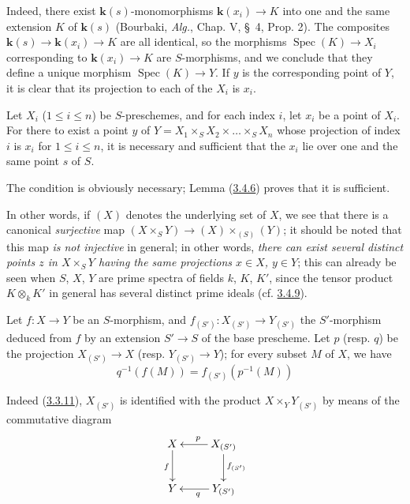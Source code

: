 Indeed, there exist $\boldsymbol{k}(s)$-monomorphisms $\boldsymbol{k}(x_i)\to K$ into one and the same
extension $K$ of $\boldsymbol{k}(s)$ (Bourbaki, \emph{Alg.}, Chap. V, \S~4, Prop. 2). The
composites $\boldsymbol{k}(s)\to \boldsymbol{k}(x_i)\to K$ are all identical, so the morphisms
$\operatorname{Spec}(K)\to X_i$ corresponding to $\boldsymbol{k}(x_i)\to K$ are
$S$-morphisms, and we conclude that they define a unique morphism
$\operatorname{Spec}(K)\to Y$. If $y$ is the corresponding point of $Y$, it
is clear that its projection to each of the $X_i$ is $x_i$.

\begin{proposition}[3.4.7]
\label{I.3.4.7}
Let $X_i$ ($1\leq i\leq n$) be $S$-preschemes, and for each index $i$,
let $x_i$ be a point of $X_i$. For there to exist a point $y$ of
$Y=X_1\times_S X_2\times\ldots\times_S X_n$ whose projection of index $i$ is
$x_i$ for $1\leq i\leq n$, it is necessary and sufficient that the $x_i$ lie
over one and the same point $s$ of $S$.
\end{proposition}

The condition is obviously necessary; Lemma
(\hyperref[I.3.4.6]{3.4.6}) proves that it is sufficient.

\label{I.3.4.7.underlying-map}
In other words, if $(X)$ denotes the underlying set of $X$, we
see that there is a canonical \emph{surjective} map
$(X\times_S Y)\to (X)\times_{(S)}(Y)$; it should be noted that this map
\emph{is not injective} in general; in other words, \emph{there can exist
several distinct points $z$ in $X\times_S Y$ having the same projections
$x\in X$, $y\in Y$}; this can already be seen when $S$, $X$, $Y$ are
prime spectra of fields $k$, $K$, $K'$, since the tensor product
$K\otimes_k K'$ in general has several distinct prime ideals
(cf. \hyperref[I.3.4.9]{3.4.9}).

\begin{corollary}[3.4.8]
\label{I.3.4.8}
Let $f:X\to Y$ be an $S$-morphism, and $f_{(S')}:X_{(S')}\to Y_{(S')}$ the
$S'$-morphism deduced from $f$ by an extension $S'\to S$ of the base prescheme.
Let $p$ (\textup{resp.} $q$) be the projection $X_{(S')}\to X$ (\textup{resp.}
$Y_{(S')}\to Y$); for every subset $M$ of $X$, we have
\label{I.3.4.8.base-change-image}
\[
  q^{-1}(f(M))=f_{(S')}(p^{-1}(M))
\]
\end{corollary}

Indeed (\hyperref[I.3.3.11]{3.3.11}), $X_{(S')}$ is identified with the
product $X\times_Y Y_{(S')}$ by means of the commutative diagram
\label{I.3.4.8.proof-diagram}
\[
  \xymatrix{
    X\ar[d]_f & X_{(S')}\ar[l]_p\ar[d]^{f_{(S')}}\\
    Y & Y_{(S')}\ar[l]^q
  }
\]

